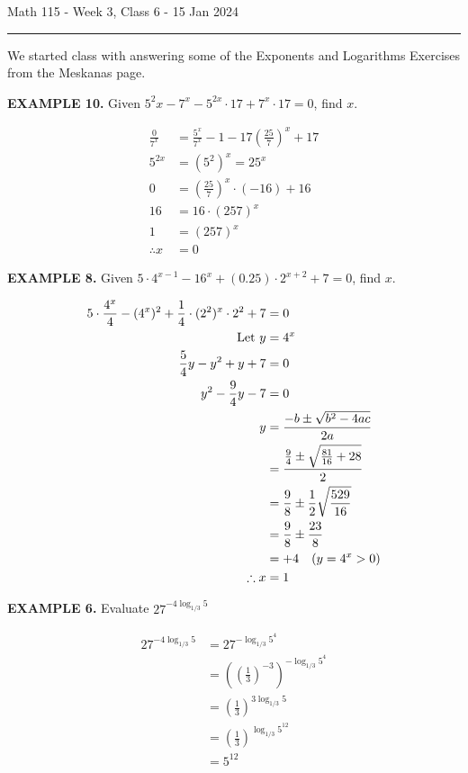 \documentclass{article}
\begin{document}
Math 115 - Week 3, Class 6 - 15 Jan 2024
\hrule

\vspace{10pt}

We started class with answering some of the Exponents and Logarithms Exercises from the Meskanas page.

\vspace{10pt}

{\bf{}EXAMPLE 10.} Given $5^2x-7^x-5^{2x}\cdot17+7^x\cdot17=0$, find $x$.

\begin{align*}
\frac{0}{7^x}&=\frac{5^x}{7^x}-1-17\left(\frac{25}{7}\right)^x+17\\
5^{2x}&=(5^2)^x=25^x\\
0&=\left(\frac{25}{7}\right)^x\cdot(-16)+16\\
16&=16\cdot\left({25}{7}\right)^x\\
1&=\left({25}{7}\right)^x\\
\therefore x&=0
\end{align*}

{\bf{}EXAMPLE 8.} Given $5\cdot4^{x-1}-16^x+(0.25)\cdot2^{x+2}+7=0$, find $x$.

\begin{align*}
5\cdot\frac{4^x}{4}-(4^x)^2+\frac{1}{4}\cdot(2^2)^x\cdot2^2+7&=0\\
\textnormal{Let }y&=4^x\\
\frac{5}{4}y-y^2+y+7&=0\\
y^2-\frac{9}{4}y-7&=0\\
y&=\frac{-b\pm\sqrt{b^2-4ac}}{2a}\\
&=\frac{\frac{9}{4}\pm\sqrt{\frac{81}{16}+28}}{2}\\
&=\frac{9}{8}\pm\frac{1}{2}\sqrt{\frac{529}{16}}\\
&=\frac{9}{8}\pm\frac{23}{8}\\
&=+4\quad (y=4^x>0)\\
\therefore x&=1
\end{align*}

{\bf{}EXAMPLE 6.} Evaluate $\displaystyle27^{-4\log_{1/3}5}$

\begin{align*}
27^{-4\log_{1/3}5}&=27^{-\log_{1/3}5^4}\\
&=\left(\left(\frac{1}{3}\right)^{-3}\right)^{-\log_{1/3}5^4}\\
&=\left(\frac{1}{3}\right)^{3\log_{1/3}5}\\
&=\left(\frac{1}{3}\right)^{\log_{1/3}5^{12}}\\
&=5^{12}
\end{align*}
\end{document}
